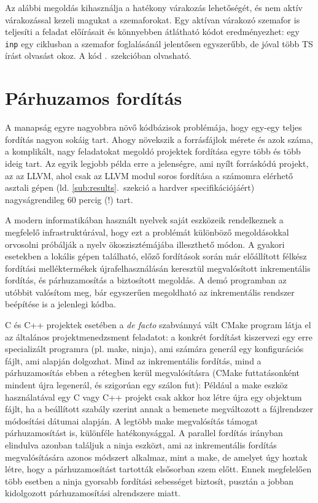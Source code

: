 \begin{sln}
    Az alábbi megoldás kihasználja a hatékony várakozás lehetőségét, és nem aktív várakozással kezeli magukat a szemaforokat.
    Egy aktívan várakozó szemafor is teljesíti a feladat előírásait és könnyebben átlátható kódot eredményezhet: egy \texttt{inp} egy ciklusban a szemafor foglalásánál jelentősen egyszerűbb, de jóval több TS írást olvasást okoz.
    A kód .~szekcióban olvasható.
\end{sln}

\section{Párhuzamos fordítás}

A manapság egyre nagyobbra növő kódbázisok problémája, hogy egy-egy teljes fordítás nagyon sokáig tart.
Ahogy növekszik a forrásfájlok mérete és azok száma, a komplikált, nagy feladatokat megoldó projektek fordítása egyre több és több ideig tart.
Az egyik legjobb példa erre a jelenségre, ami nyílt forráskódú projekt, az az LLVM, ahol csak az LLVM modul soros fordítása a számomra elérhető asztali gépen (ld. \ref{sub:results}.\ szekció a hardver specifikációjáért) nagyságrendileg 60 percig (!) tart.

A modern informatikában használt nyelvek saját eszközeik rendelkeznek a megfelelő infrastruktúrával, hogy ezt a problémát különböző megoldásokkal orvosolni próbálják a nyelv ökoszisztémájába illeszthető módon.
A gyakori esetekben a lokális gépen található, előző fordítások során már előállított félkész fordítási melléktermékek újrafelhasználásán keresztül megvalósított \un inkrementális fordítás, és párhuzamosítás a biztosított megoldás.
A demó programban az utóbbit valósítom meg, bár egyszerűen megoldható az inkrementális rendszer beépítése is a jelenlegi kódba.

C és C++ projektek esetében a \textit{de facto} szabvánnyá vált CMake program látja el az általános projektmenedzsment feladatot: a konkrét fordítást kiszervezi egy erre specializált programra (pl. make, ninja), ami számára generál egy konfigurációs fájlt, ami alapján dolgozhat.
Mind az inkrementális fordítás, mind a párhuzamosítás ebben a rétegben kerül megvalósításra (CMake futtatásonként mindent újra legenerál, és szigorúan egy szálon fut):
Például a make eszköz használatával egy C vagy C++ projekt csak akkor hoz létre újra egy objektum fájlt, ha a beállított szabály szerint annak a bemenete megváltozott a fájlrendszer módosítási dátumai alapján.
A legtöbb make megvalósítás támogat párhuzamosítást is, különféle hatékonysággal.
A parallel fordítás irányban elindulva azonban találjuk a ninja eszközt, ami az inkrementális fordítás megvalósítására azonos módszert alkalmaz, mint a make, de amelyet úgy hoztak létre, hogy a párhuzamosítást tartották elsősorban szem előtt.
Ennek megfelelően több esetben a ninja gyorsabb fordítási sebességet biztosít, pusztán a jobban kidolgozott párhuzamosítási alrendszere miatt.

